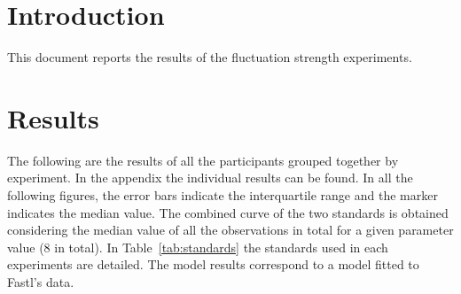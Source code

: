 \documentclass{article}
\begin{document}

\section{Introduction} %
\label{sec:introduction}

This document reports the results of the fluctuation strength experiments.


\section{Results} %
\label{sec:results}

The following are the results of all the participants grouped together by
experiment. In the appendix the individual results can be found. In all the
following figures, the error bars indicate the interquartile range and the
marker indicates the median value. The combined curve of the two standards is
obtained considering the median value of all the observations in total for a
given parameter value (8 in total). In Table~\ref{tab:standards} the standards
used in each experiments are detailed. The model results correspond to a model
fitted to Fastl's data.
\end{document}
